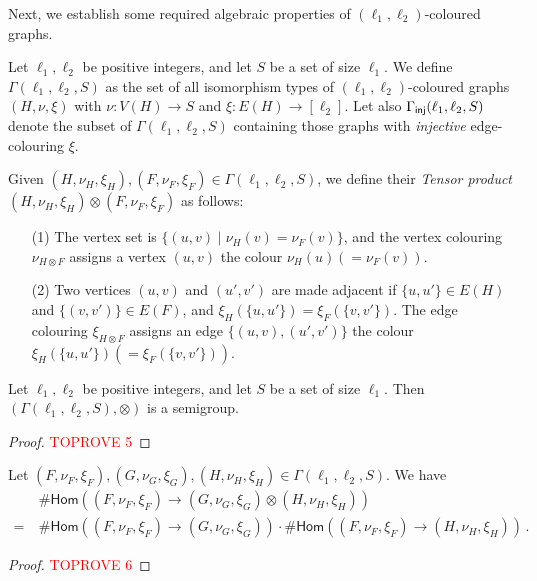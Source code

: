 \documentclass[authorcolumns,numberwithinsect]{no-lipics-v2022}
\newcommand{\homs}[2]{\mathsf{Hom}(#1 \to #2)}
\begin{document}
Next, we establish some required algebraic properties of $(\ell_1,\ell_2)$-coloured graphs.
\begin{definition}
    Let $\ell_1,\ell_2$ be positive integers, and let $S$ be a set of size $\ell_1$. We define $\Gamma(\ell_1,\ell_2,S)$ as the set of all isomorphism types of $(\ell_1,\ell_2)$-coloured graphs $(H,\nu,\xi)$ with $\nu: V(H)\to S$ and $\xi: E(H) \to [\ell_2]$. Let also $\Gamma_{\text{\sf{inj}}}(\ell_1, \ell_2, S)$ denote the subset of $\Gamma(\ell_1,\ell_2,S)$ containing those graphs with \emph{injective} edge-colouring $\xi$. 
\end{definition}


\noindent Given $(H,\nu_H,\xi_H),(F,\nu_F,\xi_F) \in \Gamma(\ell_1,\ell_2,S)$, we define their \emph{Tensor product} $(H,\nu_H,\xi_H)\otimes(F,\nu_F,\xi_F)$ as follows:
\begin{itemize}
    \item[(1)] The vertex set is $\{ (u,v) \mid \nu_H(v)=\nu_F(v) \}$,
    and the vertex colouring $\nu_{H\otimes F}$ assigns a vertex $(u,v)$ the colour $\nu_H(u)(=\nu_F(v))$.
    \item[(2)] Two vertices $(u,v)$ and $(u',v')$ are made adjacent if $\{u,u'\}\in E(H)$ and $\{(v,v')\}\in E(F)$, and $\xi_H(\{u,u'\})=\xi_F(\{v,v'\})$. The edge colouring $\xi_{H\otimes F}$ assigns an edge $\{(u,v),(u',v')\}$ the colour $\xi_H(\{u,u'\})(=\xi_F(\{v,v'\}))$.
\end{itemize}

\begin{proposition}\label{prop:semigroup}
     Let $\ell_1,\ell_2$ be positive integers, and let $S$ be a set of size $\ell_1$. Then $(\Gamma(\ell_1,\ell_2,S),\otimes)$ is a semigroup.
\end{proposition}
\begin{proof}\textcolor{red}{TOPROVE 5}\end{proof}


\begin{proposition}\label{prop:linear}
     Let $(F,\nu_F,\xi_F),(G,\nu_G,\xi_G),(H,\nu_H,\xi_H) \in \Gamma(\ell_1,\ell_2,S)$. We have 
     \begin{align*}
         ~&~\#\homs{(F,\nu_F,\xi_F)}{(G,\nu_G,\xi_G)\otimes (H,\nu_H,\xi_H)} \\
         =&~\#\homs{(F,\nu_F,\xi_F)}{(G,\nu_G,\xi_G)} \cdot \#\homs{(F,\nu_F,\xi_F)}{(H,\nu_H,\xi_H)}\,. 
     \end{align*}
\end{proposition}
\begin{proof}\textcolor{red}{TOPROVE 6}\end{proof}
\end{document}
